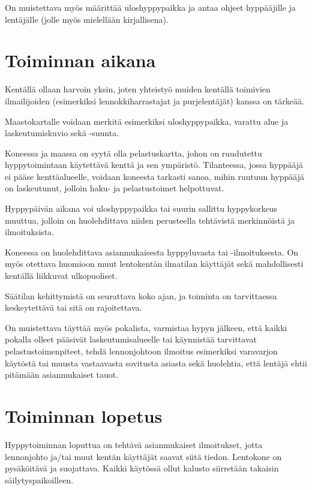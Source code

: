 On muistettava myös määrittää uloshyppypaikka ja antaa ohjeet hyppääjille ja lentäjälle (jolle myös mielellään kirjallisena). 

\section{ Toiminnan aikana }
\label{hyppytoiminnan-jarjestaminen-toiminnan-aikana}


Kentällä ollaan harvoin yksin, joten yhteistyö muiden kentällä toimivien ilmailijoiden (esimerkiksi lennokkiharrastajat ja purjelentäjät) kanssa on tärkeää. 


Maastokartalle voidaan merkitä esimerkiksi uloshyppypaikka, varattu alue ja laskeutumiskuvio sekä -suunta. 


Koneessa ja maassa on syytä olla pelastuskartta, johon on ruudutettu hyppytoimintaan käytettävä kenttä ja sen ympäristö. Tilanteessa, jossa hyppääjä ei pääse kenttäalueelle, voidaan koneesta tarkasti sanoa, mihin ruutuun hyppääjä on laskeutunut, jolloin haku- ja pelastustoimet helpottuvat. 


Hyppypäivän aikana voi uloshyppypaikka tai suurin sallittu hyppykorkeus muuttua, jolloin on huolehdittava niiden perusteella tehtävistä merkinnöistä ja ilmoituksista. 


Koneessa on huolehdittava asianmukaisesta hyppyluvasta tai -ilmoituksesta. On myös otettava huomioon muut lentokentän ilmatilan käyttäjät sekä mahdollisesti kentällä liikkuvat ulkopuoliset. 


Säätilan kehittymistä on seurattava koko ajan, ja toiminta on tarvittaessa keskeytettävä tai sitä on rajoitettava. 


On muistettava täyttää myös pokalista, varmistaa hypyn jälkeen, että kaikki pokalla olleet pääsivät laskeutumisalueelle tai käynnistää tarvittavat pelastustoimenpiteet, tehdä lennonjohtoon ilmoitus esimerkiksi varavarjon käytöstä tai muusta vastaavasta sovitusta asiasta sekä huolehtia, että lentäjä ehtii pitämään asianmukaiset tauot. 

\section{ Toiminnan lopetus }
\label{hyppytoiminnan-jarjestaminen-toiminnan-lopetus}


Hyppytoiminnan loputtua on tehtävä asianmukaiset ilmoitukset, jotta lennonjohto ja/tai muut kentän käyttäjät saavat siitä tiedon. Lentokone on pysäköitävä ja suojattava. Kaikki käytössä ollut kalusto siirretään takaisin säilytyspaikoilleen. 

